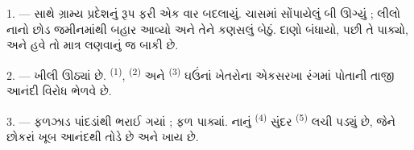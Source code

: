 %
%


\VUsaut{5.0mm}
\VUsaut{3.0mm}
\VUsaut{3.0mm}
\VUsaut{4.0mm}
\VUsaut{3.0mm}

1. ---  સાથે ગ્રામ્ય પ્રદેશનું રૂપ ફરી એક વાર બદલાયું.
ચાસમાં સોંપાયેલું બી ઊગ્યું ; લીલો નાનો છોડ જમીનમાંથી બહાર આવ્યો અને તેને
કણસલું બેઠું. દાણો બંધાયો, પછી તે પાક્યો, અને હવે તો માત્ર લણવાનું જ બાકી
છે.

2. ---  ખીલી ઊઠ્યાં છે. 
\textsuperscript{(1)},  \textsuperscript{(2)} અને
 \textsuperscript{(3)} ઘઉંનાં ખેતરોના એકસરખા રંગમાં
પોતાની તાજી  આનંદી વિરોધ ભેળવે છે.

3. --- ફળઝાડ પાંદડાંથી ભરાઈ ગયાં ; ફળ પાક્યાં. નાનું 
\textsuperscript{(4)} સુંદર  \textsuperscript{(5)} લચી
પડ્યું છે, જેને છોકરાં ખૂબ આનંદથી તોડે છે અને ખાય છે.

